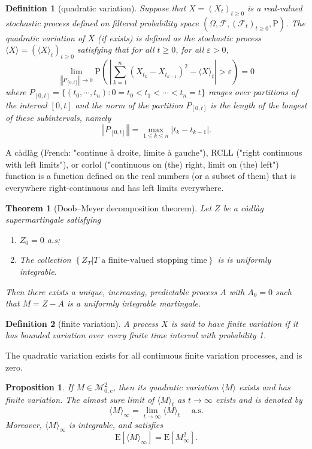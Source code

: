 \documentclass{article}
\newtheorem{definition}{Definition}[section]
\newtheorem{proposition}{Proposition}[section]
\newtheorem{theorem}{Theorem}[section]
\theoremstyle{nonumberplain}
\begin{document}
\begin{definition}[quadratic variation]	
	Suppose that $X=(X_t)_{t\ge 0}$ is a real-valued stochastic process defined on filtered probability space $(\Omega,\mathcal{F},(\mathcal{F}_{t})_{t\ge0},\mathrm{P})$. The \emph{quadratic variation} of $X$ (if exists) is defined as the stochastic process $\langle X\rangle=(\langle X\rangle_{t})_{t\ge0}$ satisfying that for all $t\ge0$, for all $\varepsilon>0$,
	\[
	\lim_{\left\Vert P_{[0,t]}\right\Vert \rightarrow 0}\mathrm{P}\left(\,\left|\sum _{k=1}^{n}(X_{t_{k}}-X_{t_{k-1}})^{2}-\langle X\rangle_{t}\right|>\varepsilon\right)=0
	\] 
	where $P_{[0,t]}=\{(t_0,\cdots,t_n):0=t_0<t_1<\cdots<t_n=t\}$ ranges over partitions of the interval $[0,t]$ and the norm of the partition $P_{[0,t]}$ is the length of the longest of these subintervals, namely
	\[
	\left\Vert P_{[0,t]}\right\Vert=\max\limits_{1\le k\le n}{|t_k-t_{k-1}|}.
	\]
\end{definition}

A càdlàg (French: "continue à droite, limite à gauche"), RCLL ("right continuous with left limits"), or corlol ("continuous on (the) right, limit on (the) left") function is a function defined on the real numbers (or a subset of them) that is everywhere right-continuous and has left limits everywhere.

\begin{theorem}[Doob–Meyer decomposition theorem]
Let $Z$ be a càdlàg supermartingale satisfying
\begin{enumerate}
	\item $Z_0=0$ a.s;
	\item The collection $\left\{Z_{T}| T \text { a finite-valued stopping time}\right\}$ is is uniformly integrable.
\end{enumerate}
Then there exists a unique, increasing, predictable process $A$ with $A_{0}=0$ such that $M=Z-A$ is a uniformly integrable martingale.
\end{theorem}

\begin{definition}[finite variation]	
	A process $X$ is said to have \emph{finite variation} if it has bounded variation over every finite time interval with probability 1.	
\end{definition}	

The quadratic variation exists for all continuous finite variation processes, and is zero.
 
\begin{proposition}
	If $M\in \mathscr{M}^2_{0,c}$, then its quadratic variation $\langle M\rangle$ exists and has finite variation. The almost sure limit of $\langle M\rangle_{t}$ as $t \rightarrow \infty$ exists and is denoted by
	\[
	\langle M\rangle_{\infty}=\lim_{t\to\infty}\langle M\rangle_{t}\quad\text{ a.s.}
	\]
	Moreover, $\langle M\rangle_{\infty}$ is integrable, and satisfies
	\[
	\mathrm{E}\left[\langle M\rangle_{\infty}\right]=\mathrm{E}\left[M_{\infty}^2\right].
	\]
\end{proposition}
\end{document}
